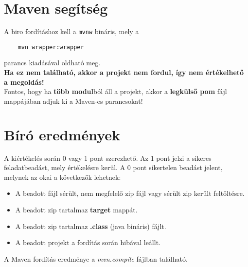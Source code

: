 \documentclass[a4paper,12pt]{article}
\begin{document}
\section{Maven segítség}

A biro fordításhoz kell a \texttt{mvnw} bináris, mely a
\begin{verbatim}
    mvn wrapper:wrapper
\end{verbatim}
parancs kiadásával oldható meg.
\\
\textbf{\color{red}Ha ez nem található, akkor a projekt nem fordul, így nem értékelhető a megoldás!}
\\
Fontos, hogy ha \textbf{több modul}ból áll a projekt, akkor a \textbf{legkülső pom} fájl mappájában adjuk ki a Maven-es parancsokat!

\section{Bíró eredmények}

A kiértékelés során 0 vagy 1 pont szerezhető.
Az 1 pont jelzi a sikeres feladatbeadást, mely értékelésre kerül.
A 0 pont sikertelen beadást jelent, melynek az okai a következők lehetnek:
\begin{itemize}
    \item A beadott fájl sérült, nem megfelelő zip fájl vagy sérült zip került feltöltésre.
    \item A beadott zip tartalmaz \textbf{target} mappát.
    \item A beadott zip tartalmaz \textbf{.class} (java bináris) fájlt.
    \item A beadott projekt a fordítás során hibával leállt.
\end{itemize}

A Maven fordítás eredménye a \textit{mvn.compile} fájlban található.
\newpage
\end{document}
